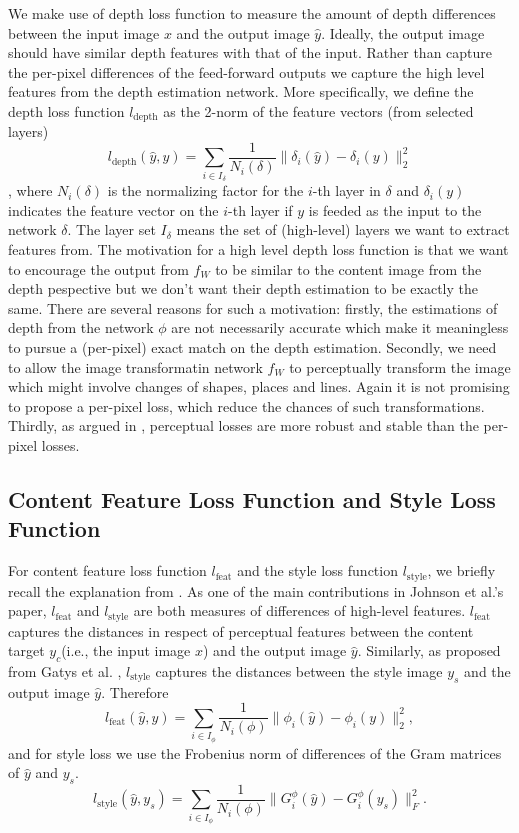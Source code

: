 \documentclass[10pt,twocolumn,letterpaper]{article}
\begin{document}
We make use of depth loss function to measure the amount of depth differences between the input image $x$ and the output image $\hat y$. Ideally, the output image should have similar depth features with that of the input. Rather than capture the per-pixel differences of the feed-forward outputs we capture the high level features from the depth estimation network. More specifically, we define the depth loss function $l_\text{depth}$ as the 2-norm of the feature vectors (from selected layers) \[l_\text{depth}(\hat y, y) = \sum_{i \in I_\delta} \frac{1}{N_i (\delta)}\|\delta_i(\hat y) - \delta_i(y)\|_2^2\], where $N_i(\delta)$ is the normalizing factor for the $i$-th layer in $\delta$ and $\delta_i(y)$ indicates the feature vector on the $i$-th layer if $y$ is feeded as the input to the network $\delta$. The layer set $I_\delta$ means the set of (high-level) layers we want to extract features from. The motivation for a high level depth loss function is that we want to encourage the output from $f_W$ to be similar to the content image from the depth pespective but we don't want their depth estimation to be exactly the same. There are several reasons for such a motivation: firstly, the estimations of depth from the network $\phi$ are not necessarily accurate which make it meaningless to pursue a (per-pixel) exact match on the depth estimation. Secondly, we need to allow the image transformatin network $f_W$ to perceptually transform the image which might involve changes of shapes, places and lines. Again it is not promising to propose a per-pixel loss, which reduce the chances of such transformations. Thirdly, as argued in \cite{johnson2016perceptual}, perceptual losses are more robust and stable than the per-pixel losses.

\subsection{Content Feature Loss Function and Style Loss Function}
For content feature loss function $l_\text{feat}$ and the style loss function $l_\text{style}$, we briefly recall the explanation from \cite{johnson2016perceptual}. As one of the main contributions in Johnson et al.'s paper, $l_\text{feat}$ and $l_\text{style}$ are both measures of differences of high-level features. $l_\text{feat}$ captures the distances in respect of perceptual features between the content target $y_c$(i.e., the input image $x$) and the output image $\hat y$. Similarly, as proposed from Gatys et al. \cite{gatys2016image}, $l_\text{style}$ captures the distances between the style image $y_s$ and the output image $\hat y$. 
Therefore
\[ l_\text{feat}(\hat y, y) = \sum_{i \in I_\phi} \frac{1}{N_i(\phi)}\|\phi_i(\hat y) - \phi_i(y)\|_2^2, \]
and for style loss we use the Frobenius norm of differences of the Gram matrices of $\hat y$ and $y_s$.
\[ l_\text{style}(\hat y, y_s) = \sum_{i \in I_\phi} \frac{1}{N_i(\phi)}\|G^\phi_i(\hat y) - G^\phi_i(y_s)\|_F^2. \]
\end{document}
